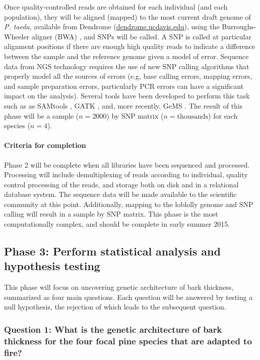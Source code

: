 Once quality-controlled reads are obtained for each individual (and each population), they will be aligned (mapped) to the 
most current draft genome of \emph{P. taeda}, available from Dendrome (\url{dendrome.ucdavis.edu}), using the 
Burroughs-Wheeler aligner (BWA) \citep{Li:2009fi}, and SNPs will be called.  A SNP is called at particular alignment positions 
if there are enough high quality reads to indicate a difference between the sample and the reference genome given a model of error. 
Sequence data from NGS technology requires the use of new SNP calling algorithms that properly model all the sources of errors 
(e.g, base calling errors, mapping errors, and sample preparation errors, particularly PCR errors can have a significant impact on the 
analysis). Several tools have been developed to perform this task such as as SAMtools \citep{Li:2009ka}, GATK \citep{McKenna:2010bv}, 
and, more recently, GeMS \citep{You:2012iy}.   The result of this phase will be a sample ($n = 2000$) by SNP 
matrix ($n = \text{thousands}$) for each species ($n = 4$).  

\paragraph{Criteria for completion} Phase 2 will be complete when all libraries have been sequenced and processed.  Processing 
will include demultiplexing of reads according to individual, quality control processing of the reads, and storage both on disk and 
in a relational database system.  The sequence data will be made available to the scientific community at this point.  Additionally, 
mapping to the loblolly genome and SNP calling will result in a sample by SNP matrix.  This phase is the most computationally 
complex, and should be complete in early summer 2015.  

\subsection*{Phase 3: Perform statistical analysis and hypothesis testing}

This phase will focus on uncovering genetic architecture of bark thickness, summarized as four main questions.  Each question will 
be answered by testing a null hypothesis, the rejection of which leads to the subsequent question.

\subsubsection*{Question 1: What is the genetic architecture of bark thickness for the four focal pine species that 
are adapted to fire?}

